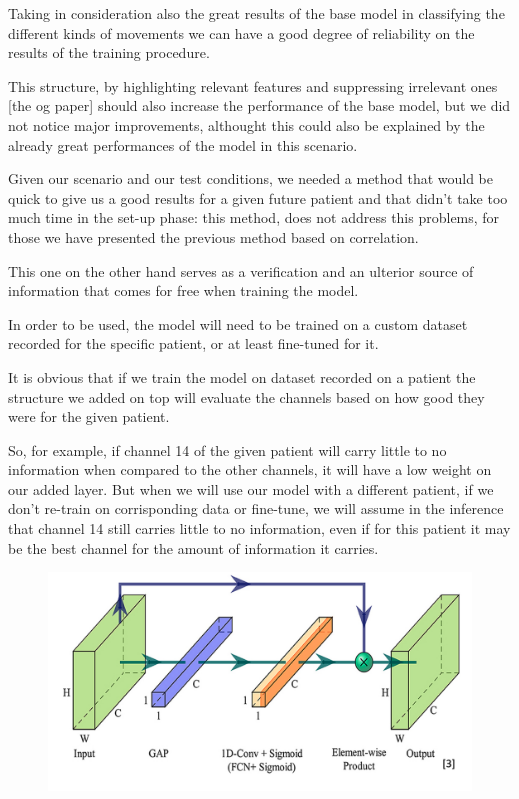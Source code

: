 \documentclass{Configuration_Files/PoliMi3i_thesis}
\begin{document}
Taking in consideration also the great results of the base model in classifying the different kinds of movements we can have a good degree of reliability on the results of the training procedure.

This structure, by highlighting relevant features and suppressing irrelevant ones [the og paper] should also increase the performance of the base model, but we did not notice major improvements, althought this could also be explained by the already great performances of the model in this scenario.

Given our scenario and our test conditions, we needed a method that would be quick to give us a good results for a given future patient and that didn't take too much time in the set-up phase: this method, does not address this problems, for those we have presented the previous method based on correlation.

This one on the other hand serves as a verification and an ulterior source of information that comes for free when training the model.

In order to be used, the model will need to be trained on a custom dataset recorded for the specific patient, or at least fine-tuned for it.

It is obvious that if we train the model on dataset recorded on a patient the structure we added on top will evaluate the channels based on how good they were for the given patient.

So, for example, if channel 14 of the given patient will carry little to no information when compared to the other channels, it will have a low weight on our added layer.
But when we will use our model with a different patient, if we don't re-train on corrisponding data or fine-tune, we will assume in the inference that channel 14 still carries little to no information, even if for this patient it may be the best channel for the amount of information it carries.





\begin{figure}[H]
	\includegraphics[scale=0.4]{channelLayer.png}
	\centering
	\end{figure}
\end{document}
